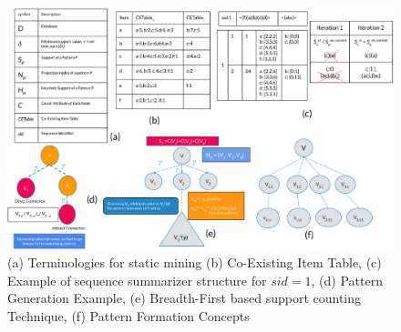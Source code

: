 \begin{figure}[!tb]
\centering
\includegraphics[width=\textwidth]{static_mining_merge_image}
\caption{(a) Terminologies for static mining (b) Co-Existing Item Table, (c) Example of sequence summarizer structure for $sid=1$, (d) Pattern Generation Example, (e) Breadth-First based support counting Technique, (f) Pattern Formation Concepts} \label{figure:static_mining_merged_images}
\hfil
\end{figure}


